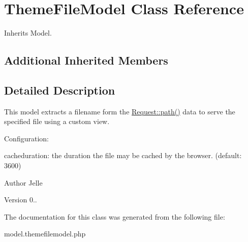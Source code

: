 \hypertarget{class_theme_file_model}{\section{Theme\-File\-Model Class Reference}
\label{class_theme_file_model}
}


Inherits Model.

\subsection*{Additional Inherited Members}


\subsection{Detailed Description}
This model extracts a filename form the \hyperlink{class_request_ae1725b521b1833602f3f554566142c51}{Request\-::path()} data to serve the specified file using a custom view.

Configuration\-:
\begin{DoxyItemize}
\item cacheduration\-: the duration the file may be cached by the browser. (default\-: 3600)
\end{DoxyItemize}

\begin{DoxyAuthor}{Author}
Jelle 
\end{DoxyAuthor}
\begin{DoxyVersion}{Version}
0.. 
\end{DoxyVersion}


The documentation for this class was generated from the following file\-:\begin{DoxyCompactItemize}
\item 
model.\-themefilemodel.\-php\end{DoxyCompactItemize}
